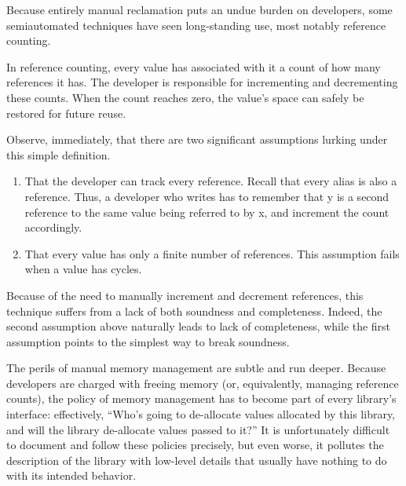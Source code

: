 
Because entirely manual reclamation puts an undue burden on developers, some
semiautomated techniques have seen long-standing use, most notably reference
counting.

In reference counting, every value has associated with it a count of how many
references it has. The developer is responsible for incrementing and
decrementing these counts. When the count reaches zero, the value’s space can
safely be restored for future reuse.

Observe, immediately, that there are two significant assumptions lurking under
this simple definition.
\begin{enumerate}
  \item
That the developer can track every reference. Recall that every alias is also a
reference. Thus, a developer who writes
has to remember that y is a second reference to the same value being referred to
by x, and increment the count accordingly.
  \item
That every value has only a finite number of references. This assumption fails
when a value has cycles.
\end{enumerate}
Because of the need to manually increment and decrement references, this
technique suffers from a lack of both soundness and completeness. Indeed, the
second assumption above naturally leads to lack of completeness, while the first
assumption points to the simplest way to break soundness.

The perils of manual memory management are subtle and run deeper. Because
developers are charged with freeing memory (or, equivalently, managing reference
counts), the policy of memory management has to become part of every library’s
interface: effectively, “Who’s going to de-allocate values allocated by this
library, and will the library de-allocate values passed to it?” It is
unfortunately difficult to document and follow these policies precisely, but
even worse, it pollutes the description of the library with low-level details
that usually have nothing to do with its intended behavior.

